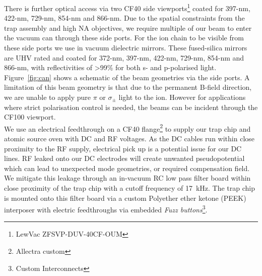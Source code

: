     There is further optical access via
    two CF40 side viewports\footnote{LewVac ZFSVP-DUV-40CF-OUM} coated
    for 397-nm, 422-nm, 729-nm, 854-nm and 866-nm.  Due to the spatial
    constraints from the trap assembly and high NA objectives, we require
    multiple of our beam to enter the vacuum can through these side ports. For the ion chain to be visible from these side ports we use in vacuum dielectric
    mirrors. These fused-silica mirrors are UHV rated and coated for 372-nm, 397-nm,
    422-nm, 729-nm, 854-nm and 866-nm, with reflectivities of >99\% for both s-
    and p-polarised light. Figure~\ref{fig:can} shows a schematic of the beam
    geometries via the side ports. A limitation of this beam geometry is that due to the permanent B-field direction, we are unable to apply pure $\pi$ or $\sigma_{\pm}$ light to the ion. However for applications where strict polarisation control is needed, the beams can be incident through the CF100 viewport.\\
    We use an electrical feedthrough on a CF40 flange\footnote{Allectra custom}
    to supply our trap chip and atomic source oven with DC and RF voltages. As
    the DC cables run within close proximity to the RF supply, electrical pick
    up is a potential issue for our DC lines. RF leaked onto our DC electrodes
    will create unwanted pseudopotential which can lead to unexpected mode
    geometries, or required compensation field. We mitigate this leakage through
    an in-vacuum RC low pass filter board within close proximity of the trap
    chip with a cutoff frequency of 17~kHz. The trap chip is mounted onto this
    filter board via a custom Polyether ether ketone (PEEK) interposer with
    electric feedthroughs via embedded \emph{Fuzz buttons}\footnote{Custom
    Interconnects}. \\

